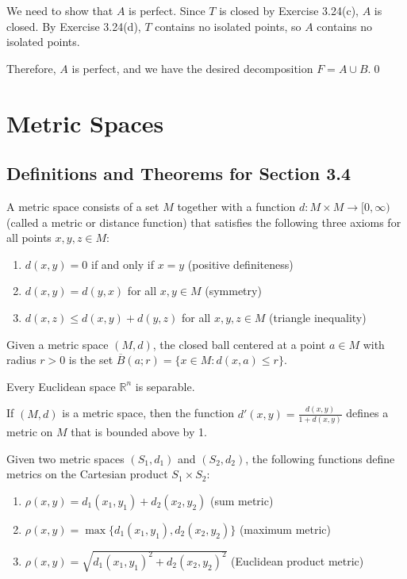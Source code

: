 We need to show that $A$ is perfect. Since $T$ is closed by Exercise 3.24(c), $A$ is closed. By Exercise 3.24(d), $T$ contains no isolated points, so $A$ contains no isolated points.

Therefore, $A$ is perfect, and we have the desired decomposition $F = A \cup B$.\qed
\section{Metric Spaces}

\subsection*{Definitions and Theorems for Section 3.4}

\begin{definition}
A metric space consists of a set $M$ together with a function $d: M \times M \to [0,\infty)$ (called a metric or distance function) that satisfies the following three axioms for all points $x, y, z \in M$:
\begin{enumerate}
\item $d(x,y) = 0$ if and only if $x = y$ (positive definiteness)
\item $d(x,y) = d(y,x)$ for all $x,y \in M$ (symmetry)
\item $d(x,z) \leq d(x,y) + d(y,z)$ for all $x,y,z \in M$ (triangle inequality)
\end{enumerate}
\end{definition}

\begin{definition}
Given a metric space $(M,d)$, the closed ball centered at a point $a \in M$ with radius $r > 0$ is the set $\overline{B}(a;r) = \{x \in M : d(x,a) \leq r\}$.
\end{definition}

\begin{theorem}
Every Euclidean space $\mathbb{R}^n$ is separable.
\end{theorem}

\begin{theorem}
If $(M,d)$ is a metric space, then the function $d'(x,y) = \frac{d(x,y)}{1 + d(x,y)}$ defines a metric on $M$ that is bounded above by 1.
\end{theorem}

\begin{theorem}
Given two metric spaces $(S_1,d_1)$ and $(S_2,d_2)$, the following functions define metrics on the Cartesian product $S_1 \times S_2$:
\begin{enumerate}
\item $\rho(x,y) = d_1(x_1,y_1) + d_2(x_2,y_2)$ (sum metric)
\item $\rho(x,y) = \max\{d_1(x_1,y_1), d_2(x_2,y_2)\}$ (maximum metric)
\item $\rho(x,y) = \sqrt{d_1(x_1,y_1)^2 + d_2(x_2,y_2)^2}$ (Euclidean product metric)
\end{enumerate}
\end{theorem}

